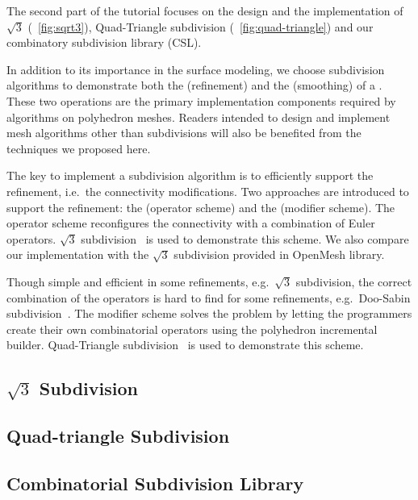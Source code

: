 The second part of the tutorial focuses on the design and the
implementation of $\sqrt{3}$ (\figurename\ \ref{fig:sqrt3}),
Quad-Triangle subdivision (\figurename\ \ref{fig:quad-triangle})
and our combinatory subdivision library (CSL).

In addition to its importance in the surface modeling, we choose
subdivision algorithms to demonstrate both the
 (refinement) and the
 (smoothing) of a
\cgalpoly . These two operations are the
primary implementation components required by algorithms on polyhedron
meshes. Readers intended to design and implement mesh algorithms other
than subdivisions will also be benefited from the techniques we
proposed here.

The key to implement a subdivision algorithm is to efficiently support
the refinement, i.e.\ the connectivity modifications. Two approaches
are introduced to support the refinement: the 
(operator scheme) and the 
(modifier scheme).  The operator scheme reconfigures the connectivity
with a combination of Euler operators. $\sqrt{3}$
subdivision~\cite{sqrt3} is used to demonstrate this scheme. We also
compare our implementation with the $\sqrt{3}$ subdivision provided in
OpenMesh library.

Though simple and efficient in some refinements, e.g.\ $\sqrt{3}$
subdivision, the correct combination of the operators is hard to find
for some refinements, e.g.\ Doo-Sabin subdivision~\cite{ds}. The
modifier scheme solves the problem by letting the programmers create
their own combinatorial operators using the polyhedron incremental
builder. Quad-Triangle subdivision~\cite{qts,l-pg-03} is used to
demonstrate this scheme.

\subsection*{$\sqrt{3}$ Subdivision}


\subsection*{Quad-triangle Subdivision}


\subsection*{Combinatorial Subdivision Library}


